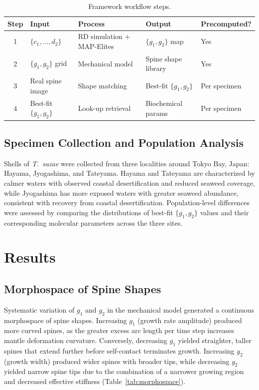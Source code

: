 \documentclass[11pt]{article}
\begin{document}
\begin{table}[htbp]
\centering
\caption{Framework workflow steps.}
\label{tab:workflow}
\begin{tabular}{cllll}
\toprule
\textbf{Step} & \textbf{Input} & \textbf{Process} & \textbf{Output} & \textbf{Precomputed?} \\
\midrule
1 & $\{c_1, \ldots, d_2\}$ & RD simulation + MAP-Elites & $\{g_1, g_2\}$ map & Yes \\
2 & $\{g_1, g_2\}$ grid & Mechanical model & Spine shape library & Yes \\
3 & Real spine image & Shape matching & Best-fit $\{g_1, g_2\}$ & Per specimen \\
4 & Best-fit $\{g_1, g_2\}$ & Look-up retrieval & Biochemical params & Per specimen \\
\bottomrule
\end{tabular}
\end{table}

\subsection{Specimen Collection and Population Analysis}

Shells of \textit{T.\ sazae} were collected from three localities around Tokyo Bay, Japan: Hayama, Jyogashima, and Tateyama. Hayama and Tateyama are characterized by calmer waters with observed coastal desertification and reduced seaweed coverage, while Jyogashima has more exposed waters with greater seaweed abundance, consistent with recovery from coastal desertification. Population-level differences were assessed by comparing the distributions of best-fit $\{g_1, g_2\}$ values and their corresponding molecular parameters across the three sites.

\section{Results}

\subsection{Morphospace of Spine Shapes}

Systematic variation of $g_1$ and $g_2$ in the mechanical model generated a continuous morphospace of spine shapes. Increasing $g_1$ (growth rate amplitude) produced more curved spines, as the greater excess arc length per time step increases mantle deformation curvature. Conversely, decreasing $g_1$ yielded straighter, taller spines that extend further before self-contact terminates growth. Increasing $g_2$ (growth width) produced wider spines with broader tips, while decreasing $g_2$ yielded narrow spine tips due to the combination of a narrower growing region and decreased effective stiffness (Table~\ref{tab:morphospace}).
\end{document}
